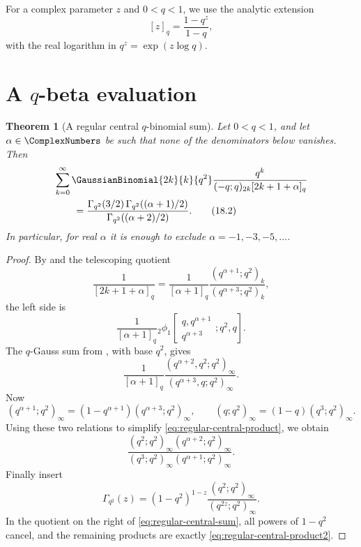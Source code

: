 \documentclass[11pt,a4paper,oneside,openany]{book}
\newtheorem{theorem}{Theorem}[chapter]
\theoremstyle{definition}
\theoremstyle{remark}
\begin{document}
For a complex parameter $z$ and $0<q<1$, we use the analytic extension
\[
 [z]_q=\frac{1-q^z}{1-q},
\]
with the real logarithm in $q^z=\exp(z\log q)$.

\section{A \texorpdfstring{$q$}{q}-beta evaluation}

\begin{theorem}[A regular central $q$-binomial sum]\label{thm:regular-central-sum}
Let $0<q<1$, and let $\alpha\in\ComplexNumbers$ be such that none of the denominators below vanishes.  Then
\begin{align}
 &\sum_{k=0}^{\infty}
 \GaussianBinomial{2k}{k}{q^2}
 \frac{q^k}{(-q;q)_{2k}[2k+1+\alpha]_q}
 \notag\\
 &\qquad=
 \frac{\Gamma_{q^2}(3/2)\,
       \Gamma_{q^2}((\alpha+1)/2)}
      {\Gamma_{q^2}((\alpha+2)/2)}.
 \tag{18.2}\label{eq:regular-central-sum}
\end{align}
In particular, for real $\alpha$ it is enough to exclude
$\alpha=-1,-3,-5,\ldots$.
\end{theorem}

\begin{proof}
By  and the telescoping quotient
\[
 \frac1{[2k+1+\alpha]_q}
 =\frac1{[\alpha+1]_q}
   \frac{(q^{\alpha+1};q^2)_k}
        {(q^{\alpha+3};q^2)_k},
\]
the left side is
\[
 \frac1{[\alpha+1]_q}
 {}_2\phi_1\!\left[
 \begin{matrix}q,q^{\alpha+1}\\q^{\alpha+3}\end{matrix};
 q^2,q\right].
\]
The $q$-Gauss sum from , with base $q^2$, gives
\[
 \frac1{[\alpha+1]_q}
 \frac{(q^{\alpha+2},q^2;q^2)_\infty}
      {(q^{\alpha+3},q;q^2)_\infty}.
 \tag{18.3}\label{eq:regular-central-product}
\]
Now
\[
 (q^{\alpha+1};q^2)_\infty
 =(1-q^{\alpha+1})(q^{\alpha+3};q^2)_\infty,
 \qquad
 (q;q^2)_\infty=(1-q)(q^3;q^2)_\infty.
\]
Using these two relations to simplify \eqref{eq:regular-central-product}, we obtain
\[
 \frac{(q^2;q^2)_\infty(q^{\alpha+2};q^2)_\infty}
 {(q^3;q^2)_\infty(q^{\alpha+1};q^2)_\infty}.
 \tag{18.4}\label{eq:regular-central-product2}
\]
Finally insert
\[
 \Gamma_{q^2}(z)
 =(1-q^2)^{1-z}
 \frac{(q^2;q^2)_\infty}{(q^{2z};q^2)_\infty}.
\]
In the quotient on the right of \eqref{eq:regular-central-sum}, all powers of $1-q^2$ cancel, and the remaining products are exactly \eqref{eq:regular-central-product2}.
\end{proof}
\end{document}
